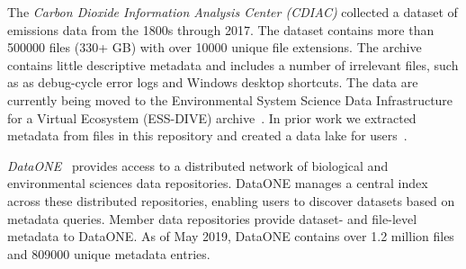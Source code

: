 \documentclass[sigconf]{acmart}
\newcommand{\kyle}[1]{}
\newcommand{\kyle}[1]{{\textcolor{purple}{ Kyle: #1 }}}
\begin{document}

The \emph{Carbon Dioxide Information Analysis Center (CDIAC)}
collected a dataset of emissions data from the 1800s through 2017.
The dataset contains more than \num{500000} files (330+ GB) 
with over \num{10000} unique file extensions. 
The archive contains little descriptive metadata 
and includes a number of irrelevant files, such as 
as debug-cycle error logs and Windows desktop shortcuts.
The data are currently being moved to the  
Environmental System Science Data Infrastructure for a Virtual Ecosystem (ESS-DIVE) archive~\cite{essdive}.
In prior work we extracted metadata from files in this repository
and created a data lake for users~\cite{skluzacek2016klimatic, skluzacek2018skluma}.

\emph{DataONE~\cite{michener2011dataone}} provides access to a distributed network
of biological and environmental sciences data repositories. 
DataONE manages a central index across these distributed repositories, enabling users
to discover datasets based on metadata queries. 
Member data repositories provide dataset- and file-level metadata to DataONE.
As of May 2019, DataONE contains over 1.2 million files and \num{809000} unique metadata entries. 
\end{document}

